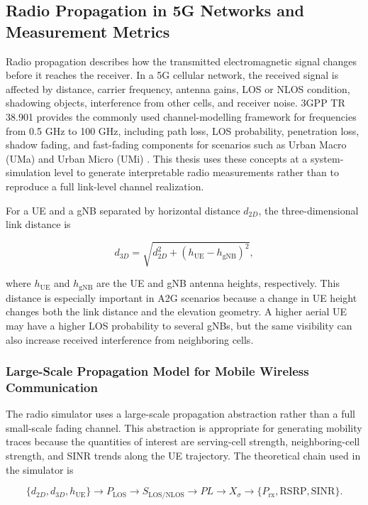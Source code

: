 \subsection{Radio Propagation in 5G Networks and Measurement Metrics}

Radio propagation describes how the transmitted electromagnetic signal changes before it reaches the receiver. In a 5G cellular network, the received signal is affected by distance, carrier frequency, antenna gains, LOS or NLOS condition, shadowing objects, interference from other cells, and receiver noise. 3GPP TR 38.901 provides the commonly used channel-modelling framework for frequencies from 0.5 GHz to 100 GHz, including path loss, LOS probability, penetration loss, shadow fading, and fast-fading components for scenarios such as Urban Macro (UMa) and Urban Micro (UMi) \cite{3gpp_38901}. This thesis uses these concepts at a system-simulation level to generate interpretable radio measurements rather than to reproduce a full link-level channel realization.

For a UE and a gNB separated by horizontal distance \(d_{2D}\), the three-dimensional link distance is

\begin{equation}
    d_{3D} = \sqrt{d_{2D}^{2} + (h_{\mathrm{UE}} - h_{\mathrm{gNB}})^{2}},
\end{equation}

where \(h_{\mathrm{UE}}\) and \(h_{\mathrm{gNB}}\) are the UE and gNB antenna heights, respectively. This distance is especially important in A2G scenarios because a change in UE height changes both the link distance and the elevation geometry. A higher aerial UE may have a higher LOS probability to several gNBs, but the same visibility can also increase received interference from neighboring cells.

\subsubsection{Large-Scale Propagation Model for Mobile Wireless Communication}

The radio simulator uses a large-scale propagation abstraction rather than a full small-scale fading channel. This abstraction is appropriate for generating mobility traces because the quantities of interest are serving-cell strength, neighboring-cell strength, and SINR trends along the UE trajectory. The theoretical chain used in the simulator is

\begin{equation}
\{d_{2D},d_{3D},h_{\mathrm{UE}}\}
\rightarrow P_{\mathrm{LOS}}
\rightarrow S_{\mathrm{LOS/NLOS}}
\rightarrow PL
\rightarrow X_{\sigma}
\rightarrow \{P_{\mathrm{rx}},\mathrm{RSRP},\mathrm{SINR}\}.
\end{equation}


